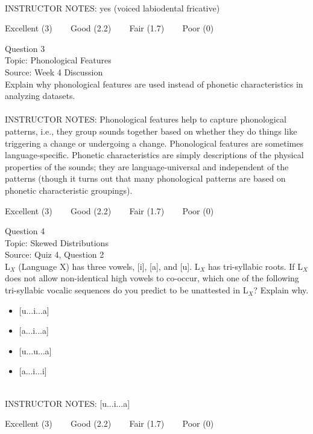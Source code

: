 \documentclass[12pt]{article}
\begin{document}
~\\
INSTRUCTOR NOTES: yes (voiced labiodental fricative)


\vfill
Excellent (3) ~~~ Good (2.2) ~~~ Fair (1.7) ~~~ Poor (0)
\newpage

{\large Question 3}\\

Topic: Phonological Features\\
Source: Week 4 Discussion\\

Explain why phonological features are used instead of phonetic characteristics in analyzing datasets.\\


~\\
INSTRUCTOR NOTES: Phonological features help to capture phonological patterns, i.e., they group sounds together based on whether they do things like triggering a change or undergoing a change. Phonological features are sometimes language-specific. Phonetic characteristics are simply descriptions of the physical properties of the sounds; they are language-universal and independent of the patterns (though it turns out that many phonological patterns are based on phonetic characteristic groupings).


\vfill
Excellent (3) ~~~ Good (2.2) ~~~ Fair (1.7) ~~~ Poor (0)
\newpage

{\large Question 4}\\

Topic: Skewed Distributions\\
Source: Quiz 4, Question 2\\

L$_X$ (Language X) has three vowels, [i], [a], and [u]. L$_X$ has tri-syllabic roots. If L$_X$ does not allow non-identical high vowels to co-occur, which one of the following tri-syllabic vocalic sequences do you predict to be unattested in L$_X$? Explain why.\\

\begin{itemize} \item {[u...i...a]} \item {[a...i...a]} \item {[u...u...a]} \item {[a...i...i]} \end{itemize}


~\\
INSTRUCTOR NOTES: [u...i...a]


\vfill
Excellent (3) ~~~ Good (2.2) ~~~ Fair (1.7) ~~~ Poor (0)
\newpage
\end{document}
